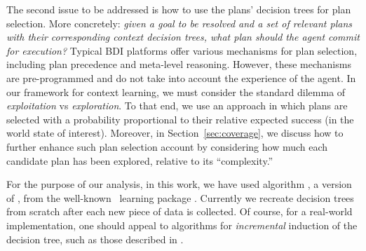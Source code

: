 The second issue to be addressed is how to use the plans' decision trees for plan
selection. More concretely: \emph{given a goal to be resolved and a set of
relevant plans with their corresponding context decision trees, what plan should
the agent commit for execution?}
Typical BDI platforms offer various mechanisms for plan selection, including plan
precedence and meta-level reasoning. However, these mechanisms are pre-programmed
and do not take into account the experience of the agent.
In our framework for context learning, we must consider the standard dilemma of
\emph{exploitation} vs \emph{exploration}. To that end, we use an 
approach in which plans are selected with a probability proportional to their relative expected
success (in the world state of interest). Moreover, in
Section~\ref{sec:coverage}, we discuss how to further enhance such plan selection
account by considering how much each candidate plan has been
explored, relative to its ``complexity.''



For the purpose of our analysis, in this work, we have used algorithm
, a version of  \cite{Mitchell97:ML}, from the
well-known \weka\ learning package \cite{weka99}. Currently we
recreate decision trees from scratch after each new piece of data is collected.
Of course, for a real-world implementation, one should appeal to algorithms for
\emph{incremental} induction of the decision tree, such as those described in
\cite{Swere06:Fast,Utgoff97Decision}.
 
%

